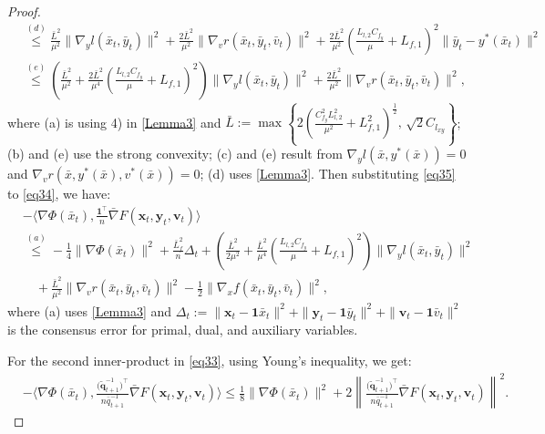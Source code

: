 \documentclass{article}
\theoremstyle{plain}
\theoremstyle{definition}
\theoremstyle{remark}
\begin{document}
\begin{proof}
\begin{align}
&\overset{(d)}{\leq} \frac{\bar{L}^2}{\mu^2} \|\nabla_y l(\bar{x}_t, \bar{y}_t)\|^2 
+ \frac{2\bar{L}^2}{\mu^2} \|\nabla_v r(\bar{x}_t, \bar{y}_t, \bar{v}_t)\|^2 
+ \frac{2\bar{L}^2}{\mu^2} \left( \frac{L_{l,2} C_{f_y}}{\mu} + L_{f,1} \right)^2 \|\bar{y}_t - y^*(\bar{x}_t)\|^2 \nonumber \\
&\overset{(e)}{\leq} \left( \frac{\bar{L}^2}{\mu^2} + \frac{2\bar{L}^2}{\mu^4} \left( \frac{L_{l,2} C_{f_y}}{\mu} + L_{f,1} \right)^2 \right) \|\nabla_y l(\bar{x}_t, \bar{y}_t)\|^2 
+ \frac{2\bar{L}^2}{\mu^2} \|\nabla_v r(\bar{x}_t, \bar{y}_t, \bar{v}_t)\|^2,\label{eq35}
\end{align}
where (a) is using 4) in \cref{Lemma3} and $\bar{L} := \max \left\{ 2 \left( \frac{C_{f_y}^2 L_{l,2}^2}{\mu^2} + L_{f,1}^2 \right)^{\frac{1}{2}}, \, \sqrt{2} C_{l_{xy}} \right\}$; (b) and (e) use the strong convexity; (c) and (e) result from \(\nabla_y l(\bar{x}, y^*(\bar{x})) = 0\) and \(\nabla_v r(\bar{x}, y^*(\bar{x}), v^*(\bar{x})) = 0\); (d) uses \cref{Lemma3}. Then substituting \cref{eq35} to \cref{eq34}, we have:
\begin{align}
&-\Bigg\langle \nabla \Phi(\bar{x}_t), \frac{\mathbf{1}^\top}{n} \bar{\nabla} F(\mathbf{x}_t, \mathbf{y}_t, \mathbf{v}_t) \Bigg\rangle \nonumber \\
&\overset{(a)}{\leq}-\frac{1}{4}\|\nabla \Phi(\bar{x}_t)\|^2+\frac{\bar{L}_{f}^2}{n}\Delta_t+ \left( \frac{\bar{L}^2}{2\mu^2} + \frac{\bar{L}^2}{\mu^4} \left( \frac{L_{l,2} C_{f_y}}{\mu} + L_{f,1} \right)^2 \right) \|\nabla_y l(\bar{x}_t, \bar{y}_t)\|^2 
\nonumber\\
&\quad+ \frac{\bar{L}^2}{\mu^2} \|\nabla_v r(\bar{x}_t, \bar{y}_t, \bar{v}_t)\|^2-\frac{1}{2}\|\nabla_x f(\bar{x}_t, \bar{y}_t, \bar{v}_t)\|^2,\label{eq36}
\end{align}
where (a) uses \cref{Lemma3} and $\Delta_t := \|\mathbf{x}_t - \mathbf{1} \bar{x}_t\|^2 + \|\mathbf{y}_t - \mathbf{1} \bar{y}_t\|^2+ \|\mathbf{v}_t - \mathbf{1} \bar{v}_t\|^2$ is the consensus error for primal, dual, and auxiliary variables.

For the second inner-product in \cref{eq33}, using Young’s inequality, we get:
\begin{align}
&- \Bigg\langle \nabla \Phi(\bar{x}_t), \frac{\big(\tilde{\mathbf{q}}_{t+1}^{-1}\big)^\top}{n\bar{q}_{t+1}^{-1}} \bar{\nabla} F(\mathbf{x}_t, \mathbf{y}_t, \mathbf{v}_t) \Bigg\rangle  \leq \frac{1}{8}\|\nabla \Phi(\bar{x}_t)\|^2 
+ 2  \left\| \frac{\big(\tilde{\mathbf{q}}_{t+1}^{-1}\big)^\top}{n\bar{q}_{t+1}^{-1}} \bar{\nabla} F(\mathbf{x}_t, \mathbf{y}_t, \mathbf{v}_t) \right\|^2. \label{eq37}
\end{align}


\end{proof}
\end{document}
